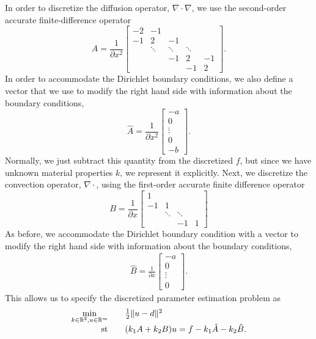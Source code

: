 \documentclass{report}
\newcommand{\re}{\mathbb{R}}
\newcommand{\st}{\textnormal{st}}
\begin{document}
        In order to discretize the diffusion operator, $\nabla\cdot\nabla$, we use the second-order accurate finite-difference operator 
$$
        A = \frac{1}{\partial x^2} \begin{bmatrix}
            -2 & -1\\ 
            -1 & 2 & -1\\ 
            & \ddots & \ddots & \ddots\\
            & & -1 & 2 & -1\\
            & & & -1 & 2
        \end{bmatrix}.
$$
In order to accommodate the Dirichlet boundary conditions, we also define a vector that we use to modify the right hand side with information about the boundary conditions,
$$
        \hat{A} = \frac{1}{\partial x^2} \begin{bmatrix}
            -a\\ 
            0\\
            \vdots\\
            0\\
            -b
        \end{bmatrix}.
$$
Normally, we just subtract this quantity from the discretized $f$, but since we have unknown material properties $k$, we represent it explicitly.  Next, we discretize the convection operator, $\nabla\cdot$, using the first-order accurate finite difference operator
$$
        B = \frac{1}{\partial x} \begin{bmatrix}
            1 \\
            -1 & 1 \\
            & \ddots & \ddots \\
            & & -1 & 1
        \end{bmatrix}
$$
As before, we accommodate the Dirichlet boundary condition with a vector to modify the right hand side with information about the boundary conditions,
\begin{align*}
        \hat{B} = \frac{1}{\partial x} \begin{bmatrix}
            -a\\ 
            0\\
            \vdots\\
            0
        \end{bmatrix}.
\end{align*}
This allows us to specify the discretized parameter estimation problem as
$$\begin{array}{rcl}
        \min\limits_{k\in\re^2,u\in\re^m}  && \frac{1}{2} \| u - d \|^2 \\
        \st && (k_1 A + k_2 B)u = f - k_1 \hat{A} - k_2 \hat{B}.
\end{array}$$
\end{document}
